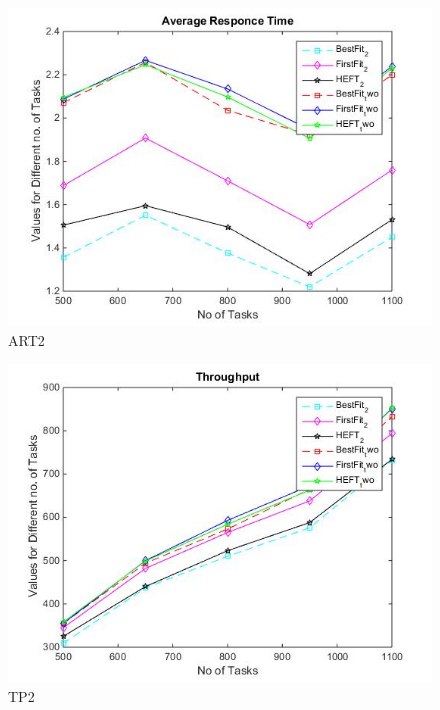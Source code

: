 \documentclass[conference]{IEEEtran}
\begin{document}

\begin{figure}[htbp]
\includegraphics[scale=0.45]{art_2_p.jpg}
\caption{ART2}
\label{fig}
\end{figure}


\begin{figure}[htbp]
\includegraphics[scale=0.45]{tp_2_p.jpg}
\caption{TP2}
\label{fig}
\end{figure}
\end{document}
